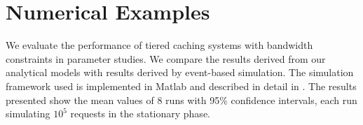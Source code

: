 \section{Numerical Examples}\label{sec:results}

We evaluate the performance of tiered caching systems with bandwidth constraints in parameter studies. We compare the results derived from our analytical models with results derived by event-based simulation. The simulation framework used is implemented in Matlab and described in detail in \cite{info3-inproceedings-2015-530}. The results presented show the mean values of 8 runs with 95\% confidence intervals, each run simulating $10^5$ requests in the stationary phase.


